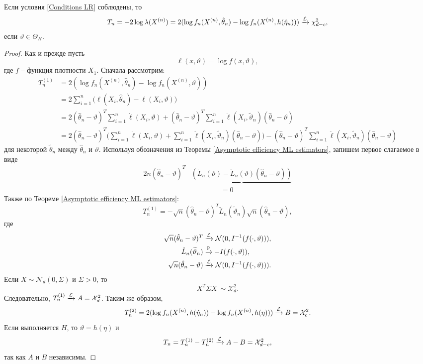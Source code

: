 \begin{thm} \label{thm7.7}
	Если условия \ref{Conditions LR} соблюдены, то
	\[ T_n=-2\log \lambda(X^{(n)})=2(\log f_n(X^{(n)}, \hat{\theta}_n)-\log f_n(X^{(n)}, h(\hat{\eta}_n))) \xrightarrow{\mathcal{L}} \chi_{d-c}^2, \]
	если $\vartheta \in \Theta_H$.
\end{thm}
\begin{proof}
	Как и прежде пусть
	\[ \ell(x, \vartheta) = \log f(x, \vartheta), \]
	где $f$ -- функция плотности $X_1$. Сначала рассмотрим:
	\[
	\begin{aligned}
	    T_n^{(1)} & = 2(\log f_n(X^{(n)}, \hat{\theta}_n)-\log f_n(X^{(n)}, \vartheta)) \\
	    & = 2\sum_{i=1}^{n}\Big(\ell(X_i, \hat{\theta}_n) - \ell(X_i, \vartheta)\Big) \\
	    & = 2(\hat{\theta}_n - \vartheta)^T \sum_{i=1}^{n} \dot{\ell}(X_i, \vartheta) +(\hat{\theta}_n - \vartheta)^T \sum_{i=1}^{n} \ddot{\ell}(X_i, \widetilde{\vartheta}_n)(\hat{\theta}_n - \vartheta)   \\
	    & = 2 (\hat{\theta}_n - \vartheta)^T \Big( \sum_{i=1}^{n} \dot{\ell}(X_i, \vartheta) + \sum_{i=1}^{n} \ddot{\ell}(X_i, \widetilde{\vartheta}_n)(\hat{\theta}_n - \vartheta) \Big) - (\hat{\theta}_n - \vartheta)^T\sum_{i=1}^{n}\ddot{\ell}(X_i, \widetilde{\vartheta}_n)(\hat{\theta}_n - \vartheta)
	\end{aligned}
	 \]
	 для некоторой $\widetilde{\theta}_n$ между $\hat{\theta}_n$ и $\vartheta$. Используя обозначения из Теоремы \ref{Asymptotic efficiency ML estimators}, запишем первое слагаемое в виде
	 \[ 
	 \begin{aligned}
	 2n(\hat{\theta}_n - \vartheta)^T& \underbrace{(\dot{L}_n(\vartheta) - \ddot{L}_n(\vartheta)(\hat{\theta}_n - \vartheta))} \\
	 & \qquad \qquad\ = 0
	 \end{aligned}
	 \]
	 Также по Теореме \ref{Asymptotic efficiency ML estimators}:
	 \[
	 T_n^{(1)} = -\sqrt{n}(\hat{\theta}_n - \vartheta)^T \ddot{L}_n(\widetilde{\vartheta}_n) \sqrt{n}(\hat{\theta}_n - \vartheta),
	 \]
	 где 
	 \[
	 \begin{aligned}
	 \sqrt{n}(\hat{\theta}_n - \vartheta)^T & \xrightarrow{\mathcal{L}} \mathcal{N}(0, I^{-1}(f(\cdot, \vartheta))), \\
	 \ddot{L}_n(\widetilde{\vartheta}_n)& \xrightarrow{\mathbb{P}} -I(f(\cdot, \vartheta)), \\
	 \sqrt{n}(\hat{\theta}_n - \vartheta) &\xrightarrow{\mathcal{L}} \mathcal{N}(0, I^{-1}(f(\cdot, \vartheta))).
	 \end{aligned}
	  \]
	  Если $X \sim \mathcal{N}_d(0, \Sigma)$ и $\Sigma > 0$, то
	  \[ X^T \Sigma X ~ \sim \mathcal{X}_d^2. \]
	  Следовательно, $T_n^{(1)} \xrightarrow{\mathcal{L}} A = \mathcal{X}_d^2$. Таким же образом,
	  \[ T_n^{(2)} = 2 (\log f_n(X^{(n)}, h(\hat{\eta}_n) ) - \log f_n(X^{(n)},h(\eta))) \xrightarrow{\mathcal{L}} B = \mathcal{X}_c^2.  \]
	  Если выполняется $H$, то $\vartheta = h(\eta)$ и
	  \[ T_n = T_n^{(1)} - T_n^{(2)} \xrightarrow{\mathcal{L}} A-B = \mathcal{X}_{d-c}^2, \]
	  так как $A$ и $B$ независимы.
\end{proof}

